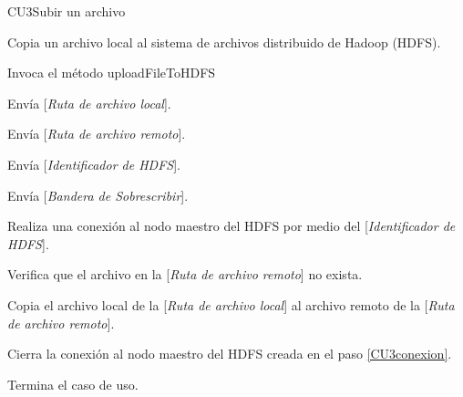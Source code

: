 \begin{UseCase}{CU3}{Subir un archivo}{

Copia un archivo local al sistema de archivos distribuido de Hadoop (HDFS).

}















\end{UseCase}


\begin{UCtrayectoria}

\UCpaso[\UCactor] Invoca el método uploadFileToHDFS

\UCpaso[\UCactor] Envía [{\em Ruta de archivo local}].

\UCpaso[\UCactor] Envía [{\em Ruta de archivo remoto}].

\UCpaso[\UCactor] Envía [{\em Identificador de HDFS}].

\UCpaso[\UCactor] Envía [{\em Bandera de Sobrescribir}].

\UCpaso[\UCsist] Realiza una conexión al nodo maestro del HDFS por medio del [{\em Identificador de HDFS}].\label{CU3conexion}

\UCpaso[\UCsist] Verifica que el archivo en la [{\em Ruta de archivo remoto}] no exista.  

\UCpaso[\UCsist] Copia el archivo local de la [{\em Ruta de archivo local}] al archivo remoto de la [{\em Ruta de archivo remoto}].\label{copia}

\UCpaso[\UCsist] Cierra la conexión al nodo maestro del HDFS creada en el paso \ref{CU3conexion}.

\UCpaso[] Termina el caso de uso.

\end{UCtrayectoria}



